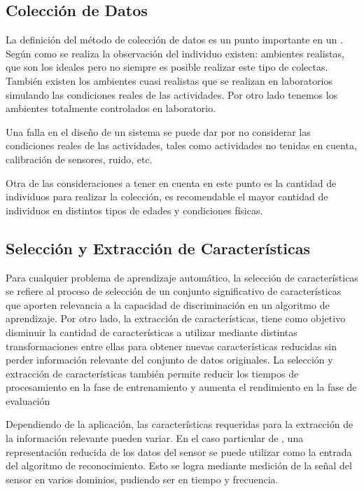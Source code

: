 \subsection{Colección de Datos}

La definición del método de colección de datos es un punto importante
en un . Según como se realiza la observación del individuo
existen: ambientes realistas, que son los ideales pero no siempre
es posible realizar este tipo de colectas. También existen los ambientes
cuasi realistas que se realizan en laboratorios simulando las condiciones
reales de las actividades. Por otro lado tenemos los ambientes totalmente
controlados en laboratorio.

Una falla en el diseño de un sistema  se puede dar por
no considerar las condiciones reales de las actividades, tales como
actividades no tenidas en cuenta, calibración de sensores, ruido,
etc.

Otra de las consideraciones a tener en cuenta en este punto es la
cantidad de individuos para realizar la colección, es recomendable
el mayor cantidad de individuos en distintos tipos de edades y condiciones
físicas.

\subsection{Selección y Extracción de Características}

Para cualquier problema de aprendizaje automático, la selección de
características se refiere al proceso de selección de un conjunto
significativo de características que aporten relevancia a la capacidad
de discriminación en un algoritmo de aprendizaje. Por otro lado, la
extracción de características, tiene como objetivo disminuir la cantidad
de características a utilizar mediante distintas transformaciones
entre ellas para obtener nuevas características reducidas sin perder
información relevante del conjunto de datos originales. La selección
y extracción de características también permite reducir los tiempos
de procesamiento en la fase de entrenamiento y aumenta el rendimiento
en la fase de evaluación

Dependiendo de la aplicación, las características requeridas para
la extracción de la información relevante pueden variar. En el caso
particular de , una representación reducida de los datos
del sensor se puede utilizar como la entrada del algoritmo de reconocimiento.
Esto se logra mediante medición de la señal del sensor en varios dominios,
pudiendo ser en tiempo y frecuencia.

